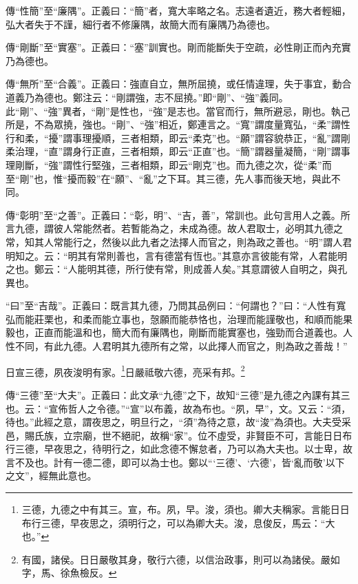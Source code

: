 {\noindent\zhuan{}\fzbyks 傳“性簡”至“廉隅”。正義曰：“簡”者，寬大率略之名。志遠者遺近，務大者輕細，弘大者失于不謹，細行者不修廉隅，故簡大而有廉隅乃為德也。 \par}

{\noindent\zhuan{}\fzbyks 傳“剛斷”至“實塞”。正義曰：“塞”訓實也。剛而能斷失于空疏，必性剛正而內充實乃為德也。 \par}

{\noindent\zhuan{}\fzbyks 傳“無所”至“合義”。正義曰：強直自立，無所屈撓，或任情違理，失于事宜，動合道義乃為德也。鄭注云：“剛謂強，志不屈撓。”即“剛”、“強”義同。此“剛”、“強”異者，“剛”是性也，“強”是志也。當官而行，無所避忌，剛也。執己所是，不為眾撓，強也。“剛”、“強”相近，鄭連言之。“寬”謂度量寬弘，“柔”謂性行和柔，“擾”謂事理擾順，三者相類，即云“柔克”也。“願”謂容貌恭正，“亂”謂剛柔治理，“直”謂身行正直，三者相類，即云“正直”也。“簡”謂器量凝簡，“剛”謂事理剛斷，“強”謂性行堅強，三者相類，即云“剛克”也。而九德之次，從“柔”而至“剛”也，惟“擾而毅”在“願”、“亂”之下耳。其三德，先人事而後天地，與此不同。 \par}

{\noindent\zhuan{}\fzbyks 傳“彰明”至“之善”。正義曰：“彰，明”、“吉，善”，常訓也。此句言用人之義。所言九德，謂彼人常能然者。若暫能為之，未成為德。故人君取士，必明其九德之常，知其人常能行之，然後以此九者之法擇人而官之，則為政之善也。“明”謂人君明知之。云：“明其有常則善也，言有德當有恆也。”其意亦言彼能有常，人君能明之也。鄭云：“人能明其德，所行使有常，則成善人矣。”其意謂彼人自明之，與孔異也。 \par}

{\noindent\shu{}\fzkt “曰”至“吉哉”。正義曰：既言其九德，乃問其品例曰：“何謂也？”曰：“人性有寬弘而能莊栗也，和柔而能立事也，愨願而能恭恪也，治理而能謹敬也，和順而能果毅也，正直而能溫和也，簡大而有廉隅也，剛斷而能實塞也，強勁而合道義也。人性不同，有此九德。人君明其九德所有之常，以此擇人而官之，則為政之善哉！” \par}

日宣三德，夙夜浚明有家。\footnote{三德，九德之中有其三。宣，布。夙，早。浚，須也。卿大夫稱家。言能日日布行三德，早夜思之，須明行之，可以為卿大夫。浚，息俊反，馬云：“大也。”}日嚴祗敬六德，亮采有邦。\footnote{有國，諸侯。日日嚴敬其身，敬行六德，以信治政事，則可以為諸侯。嚴如字，馬、徐魚檢反。}


{\noindent\zhuan{}\fzbyks 傳“三德”至“大夫”。正義曰：此文承“九德”之下，故知“三德”是九德之內課有其三也。云：“宣佈哲人之令德。”“宣”以布義，故為布也。“夙，早”，文。又云：“須，待也。”此經之意，謂夜思之，明旦行之，“須”為待之意，故“浚”為須也。大夫受采邑，賜氏族，立宗廟，世不絕祀，故稱“家”。位不虛受，非賢臣不可，言能日日布行三德，早夜思之，待明行之，如此念德不懈怠者，乃可以為大夫也。以士卑，故言不及也。計有一德二德，即可以為士也。鄭以“‘三德’、‘六德’，皆‘亂而敬’以下之文”，經無此意也。 \par}


